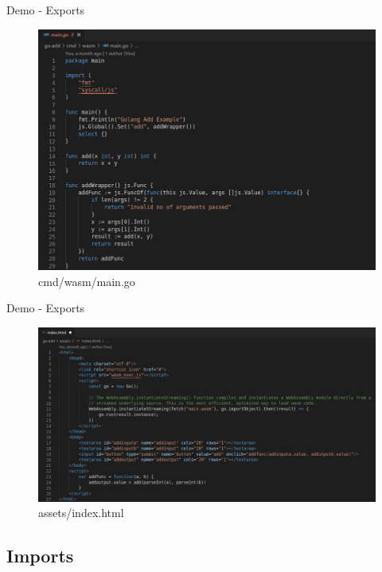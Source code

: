 \documentclass{beamer}
\begin{document}
\begin{frame}{Demo - Exports}
    \begin{figure}
        \includegraphics[scale=0.2]{./images/main.png}
        \caption{cmd/wasm/main.go}
    \end{figure}
\end{frame}

\begin{frame}{Demo - Exports}
    \begin{figure}
        \includegraphics[scale=0.2]{./images/index.png}
        \caption{assets/index.html}
    \end{figure}

\end{frame}

\subsection{Imports}
\end{document}
